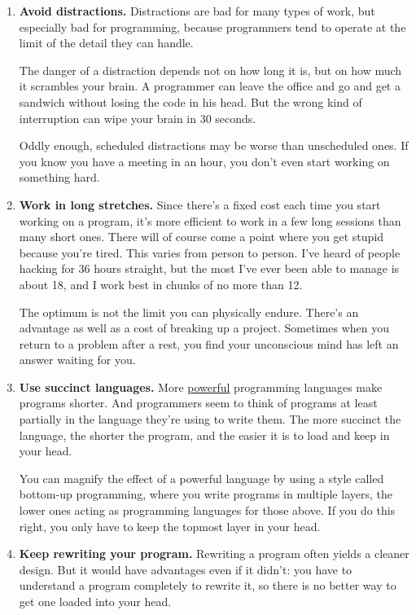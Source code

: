 \begin{enumerate}
\item  \textbf{Avoid distractions.}  Distractions are bad for many types of work,
   but especially bad for programming, because programmers tend to
   operate at the limit of the detail they can handle.

The danger of a distraction depends not on how long it is, but
   on how much it scrambles your brain.  A programmer can leave the
   office and go and get a sandwich without losing the code in his
   head.  But the wrong kind of interruption can wipe your brain
   in 30 seconds.

Oddly enough, scheduled distractions may be worse than unscheduled
   ones.  If you know you have a meeting in an hour, you don't even
   start working on something hard.


\item  \textbf{Work in long stretches.}  Since there's a fixed cost each time
   you start working on a program, it's more efficient to work in
   a few long sessions than many short ones.  There will of course
   come a point where you get stupid because you're tired.  This
   varies from person to person.  I've heard of people hacking for
   36 hours straight, but the most I've ever been able to manage
   is about 18, and I work best in chunks of no more than 12.

The optimum is not the limit you can physically endure.  There's
   an advantage as well as a cost of breaking up a project.  Sometimes
   when you return to a problem after a rest, you find your unconscious
   mind has left an answer waiting for you.


\item  \textbf{Use succinct languages.}  More 
   \href{http://www.paulgraham.com/power.html}{powerful} programming languages
   make programs shorter. And programmers seem to think of programs
   at least partially in the language they're using to write them.
   The more succinct the language, the shorter the program, and the
   easier it is to load and keep in your head.

You can magnify the effect of a powerful language by using a
   style called bottom-up programming, where you write programs in
   multiple layers, the lower ones acting as programming languages
   for those above.  If you do this right, you only have to keep
   the topmost layer in your head.


\item  \textbf{Keep rewriting your program.}  Rewriting a program often yields
   a cleaner design.  But it would have advantages even if it didn't:
   you have to understand a program completely to rewrite it, so
   there is no better way to get one loaded into your head.



\end{enumerate}
